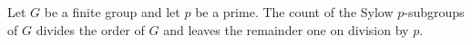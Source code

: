 \documentclass[12pt]{article}
\begin{document}
Let $G$ be a finite group and let $p$ be a prime. The count of the Sylow $p$-subgroups of $G$ divides the order of $G$ and leaves the remainder one on division by $p$.
\end{document}
